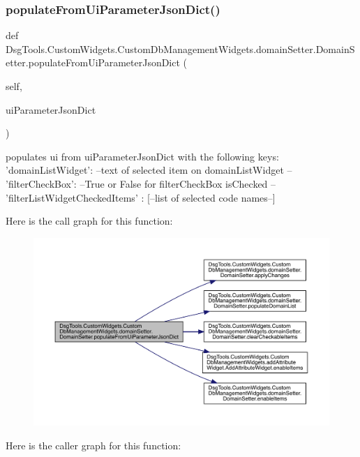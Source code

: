 \subsubsection{\texorpdfstring{populate\+From\+Ui\+Parameter\+Json\+Dict()}{populateFromUiParameterJsonDict()}}
{\footnotesize\ttfamily def Dsg\+Tools.\+Custom\+Widgets.\+Custom\+Db\+Management\+Widgets.\+domain\+Setter.\+Domain\+Setter.\+populate\+From\+Ui\+Parameter\+Json\+Dict (\begin{DoxyParamCaption}\item[{}]{self,  }\item[{}]{ui\+Parameter\+Json\+Dict }\end{DoxyParamCaption})}

\begin{DoxyVerb}populates ui from  uiParameterJsonDict with the following keys:
{
    'domainListWidget': --text of selected item on domainListWidget --
    'filterCheckBox': --True or False for filterCheckBox isChecked --
    'filterListWidgetCheckedItems' : [--list of selected code names--]
}
\end{DoxyVerb}
 Here is the call graph for this function\+:
\nopagebreak
\begin{figure}[H]
\begin{center}
\leavevmode
\includegraphics[width=350pt]{class_dsg_tools_1_1_custom_widgets_1_1_custom_db_management_widgets_1_1domain_setter_1_1_domain_setter_a078ff64c27028700336dd5ff9c5d0f25_cgraph}
\end{center}
\end{figure}
Here is the caller graph for this function\+:
\nopagebreak
